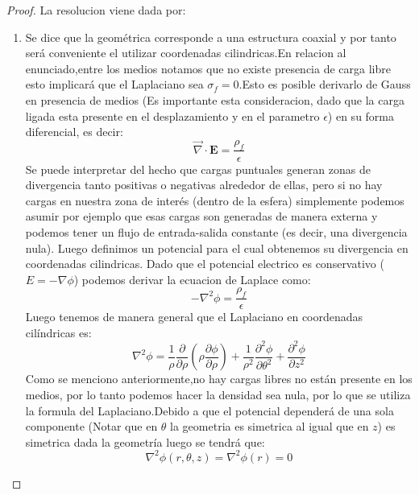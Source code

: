 \begin{proof} %
    La resolucion viene dada por:
    \begin{enumerate}
        \item Se dice que la geométrica corresponde a una estructura coaxial y por tanto será conveniente el utilizar coordenadas cilindricas.En relacion al enunciado,entre los medios notamos que no existe presencia de carga libre esto implicará que el Laplaciano sea $\sigma_f = 0$.Esto es posible derivarlo de Gauss en presencia de medios (Es importante esta consideracion, dado que la carga ligada esta presente en el desplazamiento y en el parametro $\epsilon$) en su forma  diferencial, es decir:
        \begin{equation}
            \Vec{\nabla} \cdot \textbf{E} = \frac{\rho_f}{\epsilon} 
        \end{equation}
        Se puede interpretar del hecho que cargas puntuales generan zonas de divergencia tanto positivas o negativas alrededor de ellas, pero si no hay cargas en nuestra zona de interés (dentro de la esfera) simplemente podemos asumir por ejemplo que esas cargas son generadas de manera externa y podemos tener un flujo de entrada-salida constante (es decir, una divergencia nula). Luego definimos un potencial para el cual obtenemos su divergencia en coordenadas cilindricas. Dado que el potencial electrico es conservativo ($E = - \nabla \phi$) podemos derivar la ecuacion de Laplace como:
        \begin{equation}
            -\nabla^{2}\phi = \frac{\rho_f}{\epsilon}
        \end{equation}
        Luego tenemos de manera general que el Laplaciano en coordenadas cilíndricas es:
        \begin{equation}
            \nabla^{2}\phi = \frac{1}{\rho} \frac{\partial}{\partial\rho}\left(\rho \frac{\partial\phi}{\partial \rho}\right) + \frac{1}{\rho^{2}}\frac{\partial^{2}\phi}{\partial\theta^{2}} + \frac{\partial^{2}\phi}{\partial z^{2}}
        \end{equation}
        Como se menciono anteriormente,no hay cargas libres no están presente en los medios, por lo tanto podemos hacer la densidad sea nula, por lo que se utiliza la formula del Laplaciano.Debido a que el potencial dependerá de una sola componente (Notar que en $\theta$ la geometria es simetrica al igual que en $z$) es simetrica dada la geometría luego se tendrá que:
        \begin{equation}
            \nabla^{2}\phi(r,\theta, z) =  \nabla^{2}\phi(r)=0

\end{equation}
\end{enumerate}
\end{proof}
